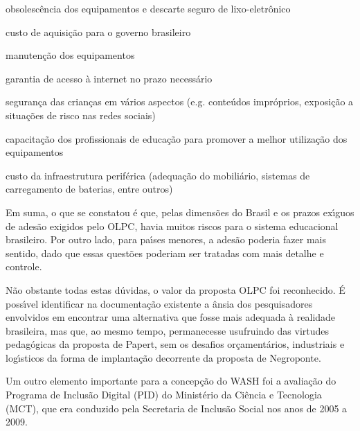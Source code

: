 \documentclass[
12pt,		%
openright,	%
twoside,  %
a4paper,			%
chapter=TITLE,		%
english,			%
french,				%
spanish,			%
brazil				%
]{USPSC-classe/USPSC}
\begin{document}
\begin{alineas}
\item obsolesc\^encia dos equipamentos e descarte seguro de lixo-eletr\^onico
\item custo de aquisi\c{c}\~ao para o governo brasileiro
\item manuten\c{c}\~ao dos equipamentos
\item garantia de acesso \`a internet no prazo necess\'ario
\item seguran\c{c}a das crian\c{c}as em v\'arios aspectos (e.g. conte\'udos impr\'oprios, exposi\c{c}\~ao a situa\c{c}\~oes de risco nas redes sociais)
\item capacita\c{c}\~ao dos profissionais de educa\c{c}\~ao para promover a melhor utiliza\c{c}\~ao dos equipamentos
\item custo da infraestrutura perif\'erica (adequa\c{c}\~ao do mobili\'ario, sistemas de carregamento de baterias, entre outros)
\end{alineas}

Em suma, o que se constatou \'e que, pelas dimens\~oes do Brasil e os prazos ex\'{\i}guos de ades\~ao exigidos pelo OLPC, havia muitos riscos para o sistema educacional brasileiro. Por outro lado, para pa\'{\i}ses menores, a ades\~ao poderia fazer mais sentido, dado que essas quest\~oes poderiam ser tratadas com mais detalhe e controle.









N\~ao obstante todas estas d\'uvidas, o valor da proposta OLPC foi reconhecido. \'E poss\'{\i}vel identificar na documenta\c{c}\~ao existente a \^ansia dos pesquisadores envolvidos em encontrar uma alternativa que fosse mais adequada \`a realidade brasileira, mas que, ao mesmo tempo, permanecesse usufruindo das virtudes pedag\'ogicas da proposta de Papert, sem os desafios or\c{c}ament\'arios, industriais e log\'{\i}sticos da forma de implanta\c{c}\~ao decorrente da proposta de Negroponte.









Um outro elemento importante para a concep\c{c}\~ao do WASH foi a avalia\c{c}\~ao do Programa de Inclus\~ao Digital (PID) do Minist\'erio da Ci\^encia e Tecnologia (MCT), que era conduzido pela Secretaria de Inclus\~ao Social nos anos de 2005 a 2009.
\end{document}
